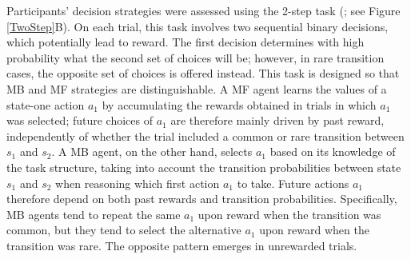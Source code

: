 \documentclass[11pt]{article} %
\begin{document}
Participants' decision strategies were assessed using the 2-step task (\cite{daw_model-based_2011}; see Figure \ref{TwoStep}B). On each trial, this task involves two sequential binary decisions, which potentially lead to reward. The first decision determines with high probability what the second set of choices will be; however, in rare transition cases, the opposite set of choices is offered instead. This task is designed so that MB and MF strategies are distinguishable. A MF agent learns the values of a state-one action $a_{1}$ by accumulating the rewards obtained in trials in which $a_{1}$ was selected; future choices of $a_{1}$ are therefore mainly driven by past reward, independently of whether the trial included a common or rare transition between $s_{1}$ and $s_{2}$. A MB agent, on the other hand, selects $a_{1}$ based on its knowledge of the task structure, taking into account the transition probabilities between state $s_{1}$ and $s_{2}$ when reasoning which first action $a_{1}$ to take. Future actions $a_{1}$ therefore depend on both past rewards and transition probabilities. Specifically, MB agents tend to repeat the same $a_{1}$ upon reward when the transition was common, but they tend to select the alternative $a_{1}$ upon reward when the transition was rare. The opposite pattern emerges in unrewarded trials.
\end{document}
